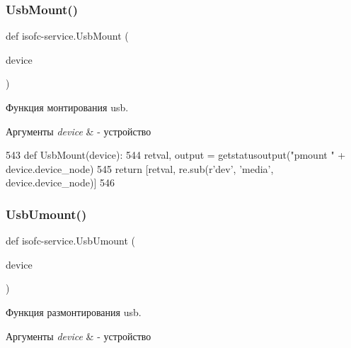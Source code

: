\mbox{\label{isofc-service_8py_file_ad24525bcc431f0f8c030e24bed019a6f}} 
\subsubsection{\texorpdfstring{Usb\+Mount()}{UsbMount()}}
{\footnotesize\ttfamily def isofc-\/service.\+Usb\+Mount (\begin{DoxyParamCaption}\item[{}]{device }\end{DoxyParamCaption})}



Функция монтирования usb. 


\begin{DoxyParams}{Аргументы}
{\em device} & -\/ устройство \\
\hline
\end{DoxyParams}

\begin{DoxyCode}
543 \textcolor{keyword}{def }UsbMount(device):
544     retval, output = getstatusoutput(\textcolor{stringliteral}{"pmount "} + device.device\_node)
545     \textcolor{keywordflow}{return} [retval, re.sub(\textcolor{stringliteral}{r'dev'}, \textcolor{stringliteral}{'media'}, device.device\_node)]
546 
\end{DoxyCode}
\mbox{\label{isofc-service_8py_file_a8078bdb80f1dc3e035795dbceec779aa}} 
\subsubsection{\texorpdfstring{Usb\+Umount()}{UsbUmount()}}
{\footnotesize\ttfamily def isofc-\/service.\+Usb\+Umount (\begin{DoxyParamCaption}\item[{}]{device }\end{DoxyParamCaption})}



Функция размонтирования usb. 


\begin{DoxyParams}{Аргументы}
{\em device} & -\/ устройство \\
\hline
\end{DoxyParams}

